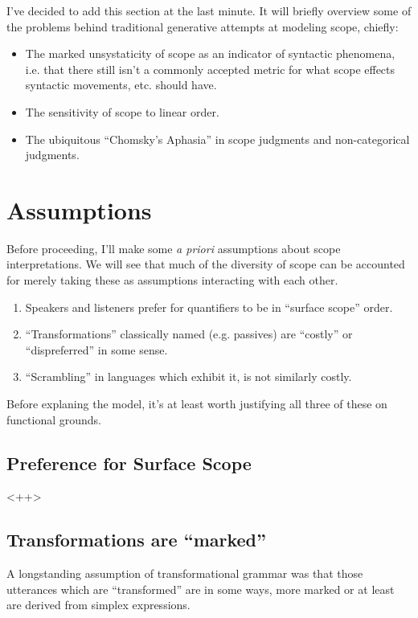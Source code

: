 \documentclass{article}
\begin{document}
I've decided to add this section at the last minute. It will briefly overview some of the problems behind traditional generative attempts at modeling scope, chiefly:

\begin{itemize}
	\item The marked unsystaticity of scope as an indicator of syntactic phenomena, i.e. that there still isn't a commonly accepted metric for what scope effects syntactic movements, etc. should have.
	\item The sensitivity of scope to linear order.
	\item The ubiquitous ``Chomsky's Aphasia'' in scope judgments and non-categorical judgments.
\end{itemize}

\section{Assumptions\label{assump}}


Before proceeding, I'll make some \emph{a priori} assumptions about scope interpretations.
We will see that much of the diversity of scope can be accounted for merely taking these as assumptions interacting with each other.

\begin{enumerate}
\item Speakers and listeners prefer for quantifiers to be in ``surface scope'' order.
\item ``Transformations'' classically named (e.g. passives) are ``costly'' or ``dispreferred'' in some sense.
\item ``Scrambling'' in languages which exhibit it, is not similarly costly.
\end{enumerate}

Before explaning the model, it's at least worth justifying all three of these on functional grounds.

\subsection{Preference for Surface Scope}

<++>

\subsection{Transformations are ``marked''}

A longstanding assumption of transformational grammar was that those utterances which are ``transformed'' are in some ways, more marked or at least are derived from simplex expressions.
\end{document}
